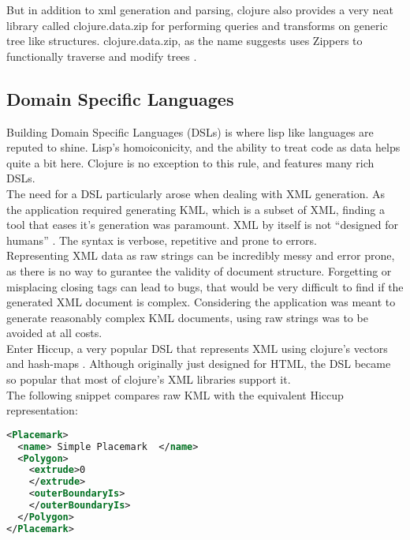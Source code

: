 But in addition to xml generation and parsing, clojure also provides a very neat library called clojure.data.zip for performing queries and transforms on generic tree like structures. clojure.data.zip, as the name suggests uses Zippers to functionally traverse and modify trees \citep{clojure:data.zip}.\\


\subsection{Domain Specific Languages}

Building Domain Specific Languages (DSLs) is where lisp like languages are reputed to shine. Lisp's homoiconicity, and the ability to treat code as data helps quite a bit here. Clojure is no exception to this rule, and features many rich DSLs.\\

The need for a DSL particularly arose when dealing with XML generation. As the application required generating KML, which is a subset of XML, finding a tool that eases it's generation was paramount. XML by itself is not ``designed for humans'' \citep{ch:xml}. The syntax is verbose, repetitive and prone to errors.\\

Representing XML data as raw strings can be incredibly messy and error prone, as there is no way to gurantee the validity of document structure. Forgetting or misplacing closing tags can lead to bugs, that would be very difficult to find if the generated XML document is complex. Considering the application was meant to generate reasonably complex KML documents, using raw strings was to be avoided at all costs.\\

Enter Hiccup, a very popular DSL that represents XML using clojure's vectors and hash-maps \citep{clj:hiccup}. Although originally just designed for HTML, the DSL became so popular that most of clojure's XML libraries support it. \\

The following snippet compares raw KML with the equivalent Hiccup representation:\\

\begin{lstlisting}[language=XML,caption= A simple placemark in raw KML]
<Placemark>
  <name> Simple Placemark  </name>
  <Polygon>
    <extrude>0
    </extrude>
    <outerBoundaryIs>
    </outerBoundaryIs>
  </Polygon>
</Placemark>
\end{lstlisting}


